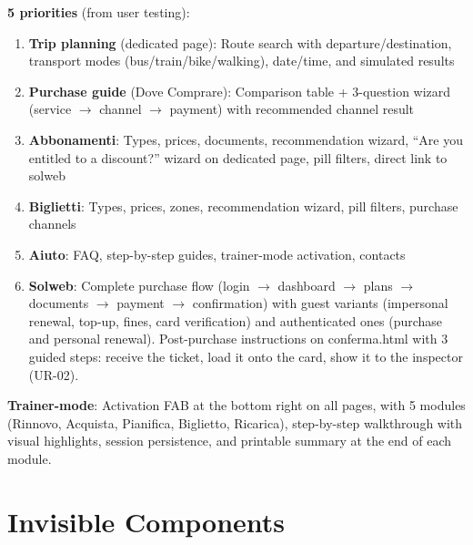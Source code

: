 ﻿\documentclass[11pt,a4paper]{article}
\begin{document}
\begin{tcolorbox}[rffield]
\small
\textbf{5 priorities} (from user testing):

\begin{enumerate}[nosep,leftmargin=*]
  \item \textbf{Trip planning} (dedicated page): Route search with departure/destination, transport modes (bus/train/bike/walking), date/time, and simulated results
  \item \textbf{Purchase guide} (Dove Comprare): Comparison table + 3-question wizard (service $\rightarrow$ channel $\rightarrow$ payment) with recommended channel result
  \item \textbf{Abbonamenti}: Types, prices, documents, recommendation wizard, ``Are you entitled to a discount?'' wizard on dedicated page, pill filters, direct link to solweb
  \item \textbf{Biglietti}: Types, prices, zones, recommendation wizard, pill filters, purchase channels
  \item \textbf{Aiuto}: FAQ, step-by-step guides, trainer-mode activation, contacts
  \item \textbf{Solweb}: Complete purchase flow (login $\rightarrow$ dashboard $\rightarrow$ plans $\rightarrow$ documents $\rightarrow$ payment $\rightarrow$ confirmation) with guest variants (impersonal renewal, top-up, fines, card verification) and authenticated ones (purchase and personal renewal). Post-purchase instructions on conferma.html with 3 guided steps: receive the ticket, load it onto the card, show it to the inspector (UR-02).
\end{enumerate}

\noindent\textbf{Trainer-mode}: Activation FAB at the bottom right on all pages, with 5 modules (Rinnovo, Acquista, Pianifica, Biglietto, Ricarica), step-by-step walkthrough with visual highlights, session persistence, and printable summary at the end of each module.
\end{tcolorbox}

\section{Invisible Components}
\end{document}
